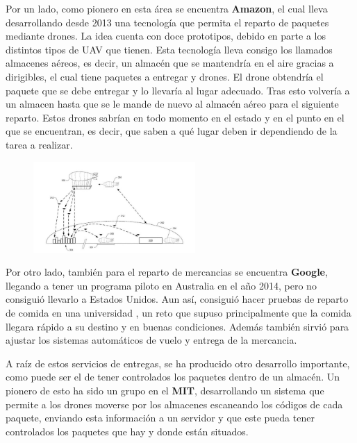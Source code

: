 \hspace{1 cm} Por un lado, como pionero en esta \'area se encuentra \textbf{Amazon}, el cual lleva desarrollando desde 2013 una tecnolog\'ia que permita el reparto de paquetes mediante drones. La idea cuenta con doce prototipos, debido en parte a los distintos tipos de UAV que tienen.  Esta tecnolog\'ia lleva consigo los llamados almacenes a\'ereos, es decir, un almac\'en que se mantendr\'ia en el aire gracias a dirigibles, el cual tiene paquetes a entregar y drones. El drone obtendr\'ia el paquete que se debe entregar y lo llevar\'ia al lugar adecuado. Tras esto volver\'ia a un almacen hasta que se le mande de nuevo al almac\'en a\'ereo para el siguiente reparto. Estos drones sabr\'ian en todo momento en el estado y en el punto en el que se encuentran, es decir, que saben a qu\'e lugar deben ir dependiendo de la tarea a realizar. 

\begin{figure}[ht]
	\centering
		\includegraphics[width=0.55\textwidth]{imgs/amazon.jpg}
	\label{fig:Esquema de reparto con drones}
\end{figure}

\hspace{1 cm} Por otro lado, tambi\'en para el reparto de mercancias se encuentra \textbf{Google}, llegando a tener un programa piloto en Australia en el año 2014, pero no consigui\'o llevarlo a Estados Unidos. Aun as\'i, consigui\'o hacer pruebas de reparto de comida en una universidad , un reto que supuso principalmente que la comida llegara r\'apido a su destino y en buenas condiciones. Adem\'as tambi\'en sirvi\'o para ajustar los sistemas autom\'aticos de vuelo y entrega de la mercancia. 

\hspace{1 cm} A ra\'iz de estos servicios de entregas, se ha producido otro desarrollo importante, como puede ser el de tener controlados los paquetes dentro de un almac\'en. Un pionero de esto ha sido un grupo en el \textbf{MIT}, desarrollando un sistema que permite a los drones moverse por los almacenes escaneando los c\'odigos de cada paquete, enviando esta informaci\'on a un servidor y que este pueda tener controlados los paquetes que hay y donde est\'an situados. 

